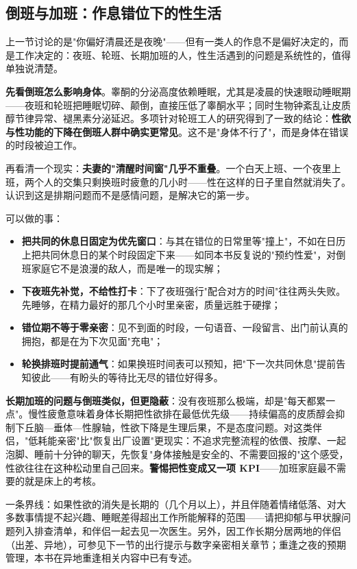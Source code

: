 \subsection{倒班与加班：作息错位下的性生活}

上一节讨论的是"你偏好清晨还是夜晚"——但有一类人的作息不是偏好决定的，而是工作决定的：夜班、轮班、长期加班的人，性生活遇到的问题是系统性的，值得单独说清楚。

\textbf{先看倒班怎么影响身体}。睾酮的分泌高度依赖睡眠，尤其是凌晨的快速眼动睡眠期——夜班和轮班把睡眠切碎、颠倒，直接压低了睾酮水平；同时生物钟紊乱让皮质醇节律异常、褪黑素分泌延迟。多项针对轮班工人的研究得到了一致的结论：\textbf{性欲与性功能的下降在倒班人群中确实更常见}。这不是"身体不行了"，而是身体在错误的时段被迫工作。

再看清一个现实：\textbf{夫妻的"清醒时间窗"几乎不重叠}。一个白天上班、一个夜里上班，两个人的交集只剩换班时疲惫的几小时——性在这样的日子里自然就消失了。认识到这是排期问题而不是感情问题，是解决它的第一步。

可以做的事：

\begin{itemize}
	\item \textbf{把共同的休息日固定为优先窗口}：与其在错位的日常里等"撞上"，不如在日历上把共同休息日的某个时段固定下来——如同本书反复说的"预约性爱"，对倒班家庭它不是浪漫的敌人，而是唯一的现实解；
	\item \textbf{下夜班先补觉，不给性打卡}：下了夜班强行"配合对方的时间"往往两头失败。先睡够，在精力最好的那几个小时里亲密，质量远胜于硬撑；
	\item \textbf{错位期不等于零亲密}：见不到面的时段，一句语音、一段留言、出门前认真的拥抱，都是在为下次见面"充电"；
	\item \textbf{轮换排班时提前通气}：如果换班时间表可以预知，把"下一次共同休息"提前告知彼此——有盼头的等待比无尽的错位好得多。
\end{itemize}

\textbf{长期加班的问题与倒班类似，但更隐蔽}：没有夜班那么极端，却是"每天都累一点"。慢性疲惫意味着身体长期把性欲排在最低优先级——持续偏高的皮质醇会抑制下丘脑—垂体—性腺轴，性欲下降是生理后果，不是态度问题。对这类伴侣，"低耗能亲密"比"恢复出厂设置"更现实：不追求完整流程的依偎、按摩、一起泡脚、睡前十分钟的聊天，先恢复"身体接触是安全的、不需要回报的"这个感受，性欲往往在这种松动里自己回来。\textbf{警惕把性变成又一项 KPI}——加班家庭最不需要的就是床上的考核。

一条界线：如果性欲的消失是长期的（几个月以上），并且伴随着情绪低落、对大多数事情提不起兴趣、睡眠差得超出工作所能解释的范围——请把抑郁与甲状腺问题列入排查清单，和伴侣一起去见一次医生。另外，因工作长期分居两地的伴侣（出差、异地），可参见下一节的出行提示与数字亲密相关章节；重逢之夜的预期管理，本书在异地重逢相关内容中已有专述。
